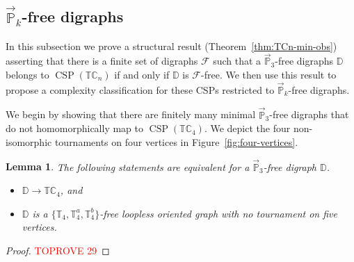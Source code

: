 \documentclass{article}
\newtheorem{lemma}[theorem]{Lemma}
\theoremstyle{definition}
\theoremstyle{remark}
\DeclareMathOperator{\CSP}{CSP}
\newcommand{\bC}{{\mathbb C}}
\newcommand{\bD}{{\mathbb D}}
\newcommand{\bP}{{\mathbb P}}
\newcommand{\bT}{{\mathbb T}}
\newcommand{\calF}{{\mathcal F}}
\begin{document}
\subsection{$\vec{\bP}_k$-free digraphs}


In this subsection we prove a structural result (Theorem~\ref{thm:TCn-min-obs})
asserting that there is a finite set of digraphs $\calF$ such that a $\vec{\bP}_3$-free
digraphs $\bD$ belongs to $\CSP(\bT\bC_n)$ if and only if $\bD$ is $\calF$-free. 
We then use this result to  propose a complexity classification for
these CSPs restricted to $\vec{\bP}_k$-free digraphs.

We begin by showing that there are finitely many minimal $\vec{\bP}_3$-free digraphs
that do not homomorphically map to $\CSP(\bT\bC_4)$. We depict the four non-isomorphic
tournaments on four vertices in Figure~\ref{fig:four-vertices}.


\begin{lemma}\label{lem:TC4-min-obs}
    The following statements are equivalent for a $\vec{\bP}_3$-free digraph $\bD$.
    \begin{itemize}
        \item $\bD\to \bT\bC_4$, and
        \item $\bD$ is a $\{\bT_4,\bT_4^a, \bT_4^b\}$-free loopless oriented graph with no tournament
        on five vertices.
    \end{itemize}
\end{lemma}
\begin{proof}\textcolor{red}{TOPROVE 29}\end{proof}
\end{document}
